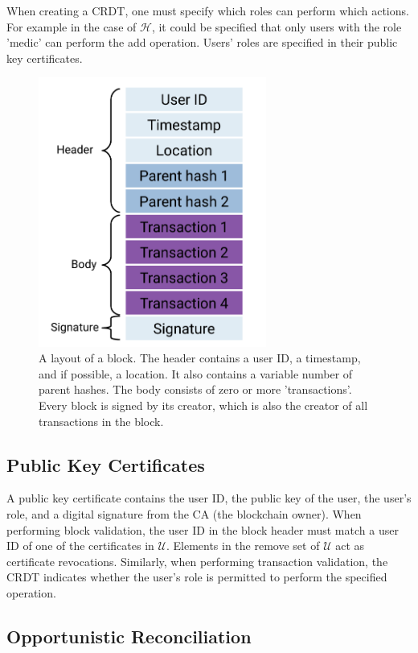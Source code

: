\documentclass[conference, letterpaper]{IEEEtran}
\begin{document}
When creating a CRDT, one must specify which roles can perform which actions. For example in the case of $\mathcal{H}$, it could be specified that only users with the role 'medic' can perform the add operation. Users' roles are specified in their public key certificates.

\begin{figure}
\centering
\includegraphics[width=7.5cm]{blockv3}
\caption{A layout of a block. The header contains a user ID, a timestamp, and if possible, a location. It also contains a variable number of parent hashes. The body consists of zero or more 'transactions'. Every block is signed by its creator, which is also the creator of all transactions in the block.}
\label{fig:block}
\end{figure}

\subsection{Public Key Certificates} %
A public key certificate contains the user ID, the public key of the user, the user's role, and a digital signature from the CA (the blockchain owner). When performing block validation, the user ID in the block header must match a user ID of one of the certificates in $\mathcal{U}$.  Elements in the remove set of $\mathcal{U}$ act as certificate revocations. Similarly, when performing transaction validation, the CRDT indicates whether the user's role is permitted to perform the specified operation.

\subsection{Opportunistic Reconciliation}
\end{document}
